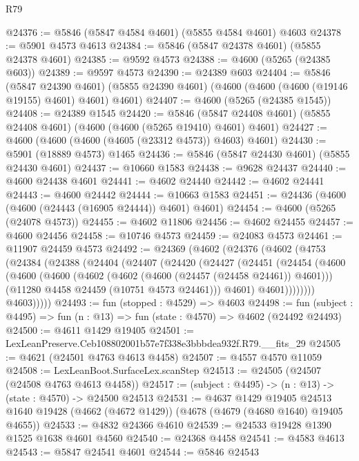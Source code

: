 \begin{lexlean}{R79}
\begin{coremodule}
@24376 := @5846 (@5847 @4584 @4601) (@5855 @4584 @4601) @4603
@24378 := @5901 @4573 @4613
@24384 := @5846 (@5847 @24378 @4601) (@5855 @24378 @4601)
@24385 := @9592 @4573
@24388 := @4600 (@5265 (@24385 @603))
@24389 := @9597 @4573
@24390 := @24389 @603
@24404 := @5846
    (@5847 @24390 @4601)
    (@5855 @24390 @4601)
    (@4600 (@4600 (@4600 (@19146 @19155) @4601) @4601) @4601)
@24407 := @4600 (@5265 (@24385 @1545))
@24408 := @24389 @1545
@24420 := @5846 (@5847 @24408 @4601) (@5855 @24408 @4601) (@4600 (@4600 (@5265 @19410) @4601) @4601)
@24427 := @4600 (@4600 (@4600 (@4605 (@23312 @4573)) @4603) @4601)
@24430 := @5901 (@18889 @4573) @1465
@24436 := @5846 (@5847 @24430 @4601) (@5855 @24430 @4601)
@24437 := @10660 @1583
@24438 := @9628 @24437
@24440 := @4600 @24438 @4601
@24441 := @4602 @24440
@24442 := @4602 @24441
@24443 := @4600 @24442
@24444 := @10663 @1583
@24451 := @24436 (@4600 (@4600 (@24443 (@16905 @24444)) @4601) @4601)
@24454 := @4600 (@5265 (@24078 @4573))
@24455 := @4602 @11806
@24456 := @4602 @24455
@24457 := @4600 @24456
@24458 := @10746 @4573
@24459 := @24083 @4573
@24461 := @11907 @24459 @4573
@24492 := @24369
    (@4602
      (@24376
        (@4602
          (@4753
            (@24384
              (@24388
                (@24404
                  (@24407
                    (@24420
                      (@24427
                        (@24451
                          (@24454
                            (@4600
                              (@4600
                                (@4600
                                  (@4602 (@4602 (@4600 (@24457 (@24458 @24461)) @4601)))
                                  (@11280 @4458 @24459 (@10751 @4573 @24461)))
                                @4601)
                              @4601))))))))
              @4603)))))
@24493 := fun (stopped : @4529) => @4603
@24498 := fun (subject : @4495) => fun (n : @13) => fun (state : @4570) => @4602 (@24492 @24493)
@24500 := @4611 @1429 @19405
@24501 := LexLeanPreserve.Ceb108802001b57e7f338e3bbbdea932f.R79.__fits_29
@24505 := @4621 (@24501 @4763 @4613 @4458)
@24507 := @4557 @4570 @11059
@24508 := LexLeanBoot.SurfaceLex.scanStep
@24513 := @24505 (@24507 (@24508 @4763 @4613 @4458))
@24517 := (subject : @4495) -> (n : @13) -> (state : @4570) -> @24500 @24513
@24531 := @4637
    @1429
    @19405
    @24513
    @1640
    @19428
    (@4662 (@4672 @1429))
    (@4678 (@4679 (@4680 @1640) @19405 @4655))
@24533 := @4832 @24366 @4610
@24539 := @24533 @19428 @1390 @1525 @1638 @4601 @4560
@24540 := @24368 @4458
@24541 := @4583 @4613
@24543 := @5847 @24541 @4601
@24544 := @5846 @24543

\end{coremodule}
\end{lexlean}
